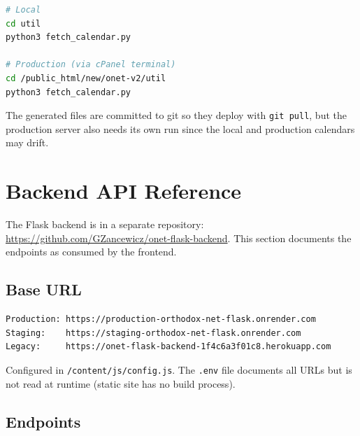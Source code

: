 \documentclass[12pt]{article}
\begin{document}
\begin{lstlisting}[language=bash,numbers=none]
# Local
cd util
python3 fetch_calendar.py

# Production (via cPanel terminal)
cd /public_html/new/onet-v2/util
python3 fetch_calendar.py
\end{lstlisting}

The generated files are committed to git so they deploy with \texttt{git pull}, but the production server also needs its own run since the local and production calendars may drift.

\section{Backend API Reference}

The Flask backend is in a separate repository:
\url{https://github.com/GZancewicz/onet-flask-backend}.
This section documents the endpoints as consumed by the frontend.

\subsection{Base URL}

\begin{lstlisting}[language=bash,numbers=none]
Production: https://production-orthodox-net-flask.onrender.com
Staging:    https://staging-orthodox-net-flask.onrender.com
Legacy:     https://onet-flask-backend-1f4c6a3f01c8.herokuapp.com
\end{lstlisting}

Configured in \texttt{/content/js/config.js}. The \texttt{.env} file documents all URLs but is not read at runtime (static site has no build process).

\subsection{Endpoints}
\end{document}
